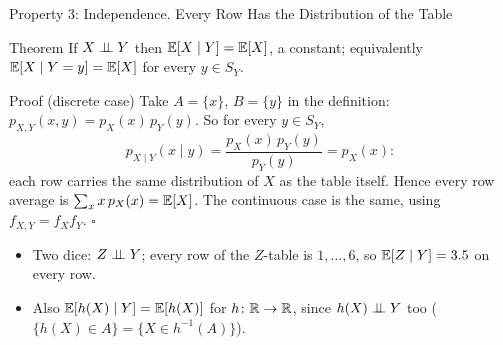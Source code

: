 \begin{frame}{Property 3: Independence. Every Row Has the Distribution of the Table}
  \small
  \begin{block}{Theorem}
    If $X\perp\!\!\!\perp Y$ then $\mathbb{E}[X\mid Y]=\mathbb{E}[X]$, a constant; equivalently $\mathbb{E}[X\mid Y=y]=\mathbb{E}[X]$ for every $y\in S_Y$.
  \end{block}
  \begin{block}{Proof (discrete case)}
    Take $A=\{x\}$, $B=\{y\}$ in the definition: $p_{X,Y}(x,y)=p_X(x)\,p_Y(y)$. So for every $y\in S_Y$,
    \[
      p_{X\mid Y}(x\mid y)=\frac{p_X(x)\,p_Y(y)}{p_Y(y)}=p_X(x):
    \]
    each row carries the same distribution of $X$ as the table itself. Hence every row average is $\sum_x x\,p_X(x)=\mathbb{E}[X]$.
    The continuous case is the same, using $f_{X,Y}=f_Xf_Y$. \hfill$\square$
  \end{block}
  \begin{itemize}
    \item Two dice: $Z\perp\!\!\!\perp Y$; every row of the $Z$-table is $1,\dots,6$, so $\mathbb{E}[Z\mid Y]=3.5$ on every row.
    \item Also $\mathbb{E}[h(X)\mid Y]=\mathbb{E}[h(X)]$ for $h\colon\mathbb{R}\to\mathbb{R}$, since $h(X)\perp\!\!\!\perp Y$ too ($\{h(X)\in A\}=\{X\in h^{-1}(A)\}$).
  \end{itemize}
\end{frame}

